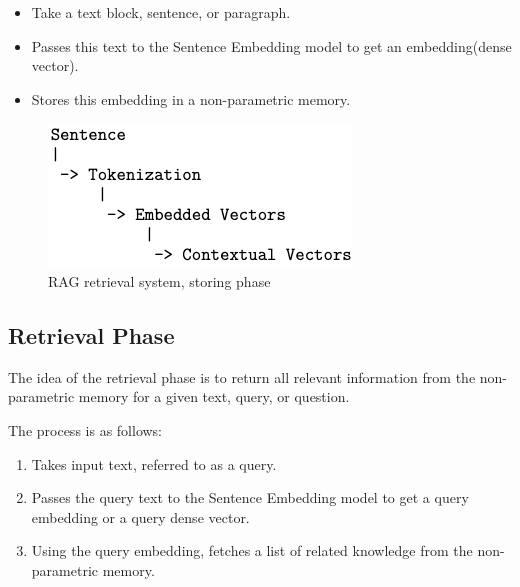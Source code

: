 \documentclass{wseas}
\begin{document}
\begin{itemize}
\item
  \begin{enumerate}
    Take a text block, sentence, or paragraph.
  \end{enumerate}
\item
  \begin{enumerate}
    Passes this text to the Sentence Embedding model to get an
    embedding(dense vector).
  \end{enumerate}
\item
  \begin{enumerate}
    Stores this embedding in a non-parametric memory.
  \end{enumerate}
\end{itemize}

\begin{figure}[htbp]
  \centering
  \includegraphics[width=\linewidth]{resources/v1/retrievalSystemStoringPhase.png}
  \caption{RAG retrieval system, storing phase}
  \label{fig:retrieval_system_storing_phase_figure}
\end{figure}

\subsection{Retrieval Phase}

The idea of the retrieval phase is to return all relevant information
from the non-parametric memory for a given text, query, or question.

The process is as follows:

\begin{enumerate}
\def\labelenumi{\arabic{enumi}.}
\item
  Takes input text, referred to as a query.
\item
  Passes the query text to the Sentence Embedding model to get a query
  embedding or a query dense vector.
\item
  Using the query embedding, fetches a list of related knowledge from
  the non-parametric memory.
\end{enumerate}
\end{document}
